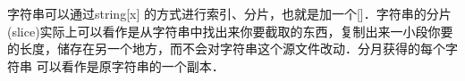 
字符串可以通过string[x] 的方式进行索引、分片，也就是加一个[]．字符串的分片(slice)实际上可以看作是从字符串中找出来你要截取的东西，复制出来一小段你要的长度，储存在另一个地方，而不会对字符串这个源文件改动．分月获得的每个字符串
可以看作是原字符串的一个副本．